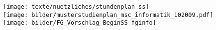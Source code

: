 \documentclass[12pt]{n-te}
\newcommand{\mehrInfo}[1]{\fbox{$\rightarrow$ #1 }}
\begin{document}
  
%  

%  
\renewcommand{\baselinestretch}{0.85}\normalsize
  \newpage
  \clearpage
  \newpage

    \begin{multicols}{2}

\end{multicols}
\texttt{[image: texte/nuetzliches/stundenplan-ss]}
\\
\texttt{[image: bilder/musterstudienplan\_msc\_informatik\_102009.pdf]}
\\
\texttt{[image: bilder/FG\_Vorschlag\_BeginSS-fginfo]}
\newpage
\begin{multicols}{2}

  \end{multicols}
\end{document}
